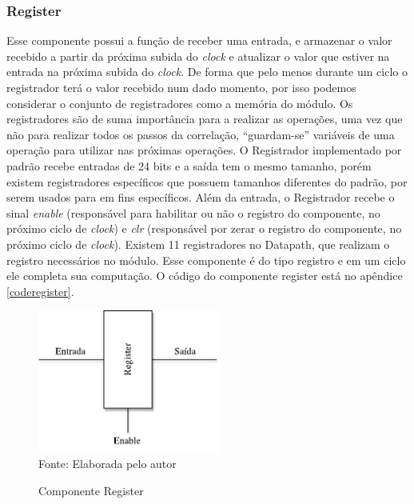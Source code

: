 \subsubsection{Register}
Esse componente possui a função de receber uma entrada, e armazenar o valor recebido a partir da próxima subida do \textit{clock} e atualizar o valor que estiver na entrada na próxima subida do \textit{clock}. De forma que pelo menos durante um ciclo o registrador terá o valor recebido num dado momento, por isso podemos considerar o conjunto de registradores como a memória do módulo. Os registradores são de suma importância para a realizar as operações, uma vez que não para realizar todos os passos da correlação, “guardam-se” variáveis de uma operação para utilizar nas próximas operações. O Registrador implementado por padrão recebe entradas de 24 bits e a saída tem o mesmo tamanho, porém existem registradores específicos que possuem tamanhos diferentes do padrão, por serem usados para em fins específicos. Além da entrada, o Registrador recebe o sinal \textit{enable} (responsável para habilitar ou não o registro do componente, no próximo ciclo de \textit{clock}) e \textit{clr} (responsável por zerar o registro do componente, no próximo ciclo de \textit{clock}). Existem 11 registradores no Datapath, que realizam o registro necessários no módulo. Esse componente é do tipo registro e em um ciclo ele completa sua computação. O código do componente register está no apêndice \ref{coderegister}.

\begin{figure}[H]
	\centering
	\caption{Componente Register}
	\includegraphics[width=6cm]{figures/Register.pdf}\\
	
		{Fonte: Elaborada pelo autor}
	\label{register}
\end{figure}


